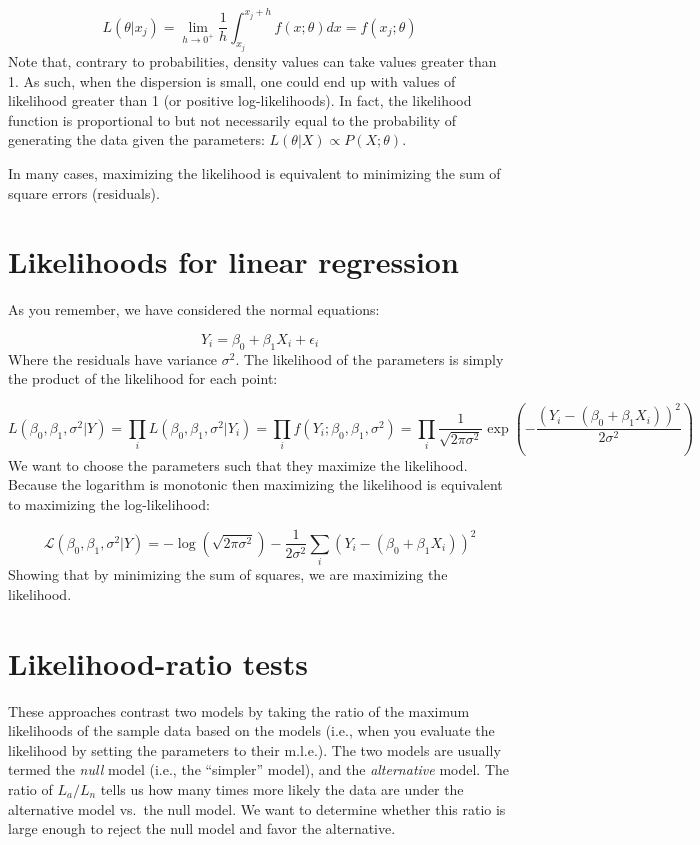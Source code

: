 \documentclass[
  letterpaper,
  DIV=11,
  numbers=noendperiod]{scrreprt}
\begin{document}
\[
L(\theta \vert x_j) = \lim_{h \to 0^+} \frac{1}{h} \int_{x_j}^{x_j + h} f(x ; \theta) dx = f(x_j ; \theta)
\] Note that, contrary to probabilities, density values can take values
greater than 1. As such, when the dispersion is small, one could end up
with values of likelihood greater than 1 (or positive log-likelihoods).
In fact, the likelihood function is proportional to but not necessarily
equal to the probability of generating the data given the parameters:
\(L(\theta\vert X) \propto P(X; \theta)\).

In many cases, maximizing the likelihood is equivalent to minimizing the
sum of square errors (residuals).

\hypertarget{likelihoods-for-linear-regression}{%
\section{Likelihoods for linear
regression}\label{likelihoods-for-linear-regression}}

As you remember, we have considered the normal equations:

\[
Y_i = \beta_0 + \beta_1 X_i + \epsilon_i
\] Where the residuals have variance \(\sigma^2\). The likelihood of the
parameters is simply the product of the likelihood for each point:

\[
L(\beta_0, \beta_1, \sigma^2 \vert Y) = \prod_i L(\beta_0, \beta_1, \sigma^2 \vert Y_i) = \prod_i f(Y_i; \beta_0, \beta_1, \sigma^2) = 
\prod_i \frac{1}{\sqrt{2 \pi \sigma^2}} \exp\left(-\frac{(Y_i - (\beta_0 + \beta_1 X_i))^2}{2 \sigma^2}\right)
\] We want to choose the parameters such that they maximize the
likelihood. Because the logarithm is monotonic then maximizing the
likelihood is equivalent to maximizing the log-likelihood:

\[
\mathcal L(\beta_0, \beta_1, \sigma^2 \vert Y) = -\log\left(\sqrt{2 \pi \sigma^2}\right) -\frac{1}{{2 \sigma^2}} \sum_i {(Y_i - (\beta_0 + \beta_1 X_i))^2}
\] Showing that by minimizing the sum of squares, we are maximizing the
likelihood.

\hypertarget{likelihood-ratio-tests}{%
\section{Likelihood-ratio tests}\label{likelihood-ratio-tests}}

These approaches contrast two models by taking the ratio of the maximum
likelihoods of the sample data based on the models (i.e., when you
evaluate the likelihood by setting the parameters to their m.l.e.). The
two models are usually termed the \emph{null} model (i.e., the
``simpler'' model), and the \emph{alternative} model. The ratio of
\(L_a / L_n\) tells us how many times more likely the data are under the
alternative model vs.~the null model. We want to determine whether this
ratio is large enough to reject the null model and favor the
alternative.
\end{document}
